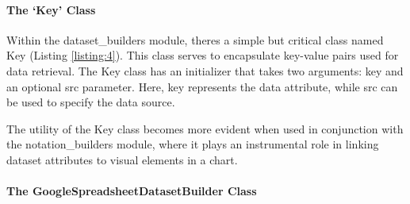 
\paragraph{The `Key' Class}\label{the-key-class}

Within the dataset\_builders module, there\textquotesingle s a simple
but critical class named Key (Listing \ref{listing:4}). This class serves to
encapsulate key-value pairs used for data retrieval. The Key class has
an initializer that takes two arguments: key and an optional src
parameter. Here, key represents the data attribute, while src can be
used to specify the data source.



The utility of the Key class becomes more evident when used in
conjunction with the notation\_builders module, where it plays an
instrumental role in linking dataset attributes to visual elements in a
chart.

\paragraph{The GoogleSpreadsheetDatasetBuilder
Class}\label{the-googlespreadsheetdatasetbuilder-class}

